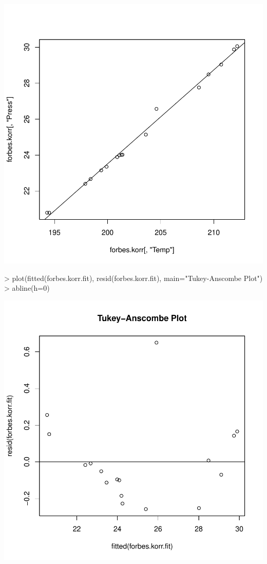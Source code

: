 \includegraphics{sw12_1-009}
\begin{Schunk}
\begin{Sinput}
> plot(fitted(forbes.korr.fit), resid(forbes.korr.fit), main="Tukey-Anscombe Plot")
> abline(h=0)
\end{Sinput}
\end{Schunk}
\includegraphics{sw12_1-010}
